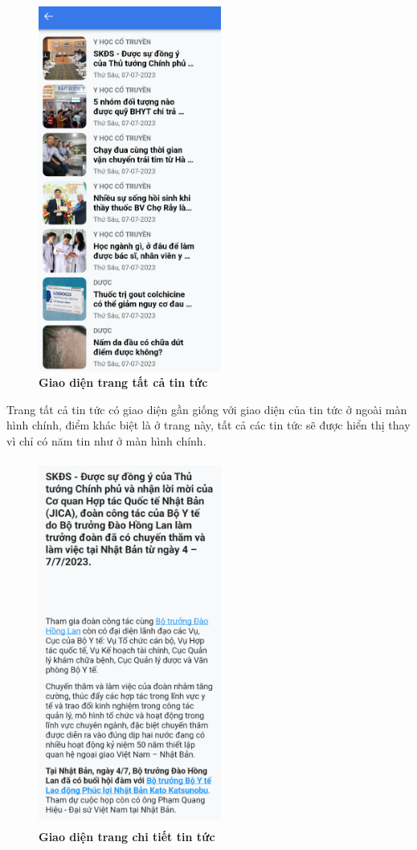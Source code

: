 \begin{figure}[H]
  \centering
  \includegraphics[width=6cm,height=12cm]{Images/mobile_app/demo/all_news.png}
  \caption[Giao diện trang tất cả tin túc]{\bfseries \fontsize{12pt}{0pt}\selectfont Giao diện trang tất cả tin tức}
  \label{demo_all_news}
\end{figure}
Trang tất cả tin tức có giao diện gần giống với giao diện của tin tức ở ngoài màn hình chính, điểm khác biệt là ở trang này,
tất cả các tin tức sẽ được hiển thị thay vì chỉ có năm tin như ở màn hình chính.

\begin{figure}[H]
  \centering
  \includegraphics[width=6cm,height=12cm]{Images/mobile_app/demo/detail_news.png}
  \caption[Giao diện trang chi tiết tin tức]{\bfseries \fontsize{12pt}{0pt}\selectfont Giao diện trang chi tiết tin tức}
  \label{demo_detail_news}
\end{figure}

